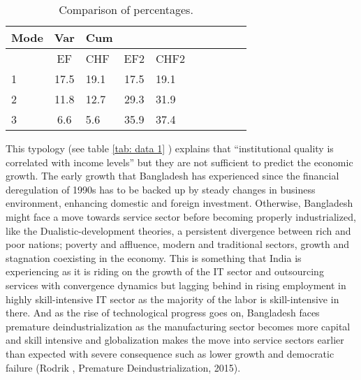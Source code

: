 \begin{table}[!h] 
\caption{Comparison of percentages.}
\begin{tabular}{lclclclclc}
\hline
\hline 
Mode &  Var  &  Cum\\
\hline
{}       & EF   & CHF    & EF2   & CHF2\\
1   &  17.5 & 19.1   & 17.5  & 19.1\\
2   &  11.8 & 12.7   & 29.3  &  31.9\\
3   &  6.6  &  5.6         & 35.9    &  37.4\\
\hline
\end{tabular}
\end{table}

This typology (see table \ref{tab: data 1} ) explains that “institutional quality is correlated with income levels” but they are not sufficient to predict the economic growth. The early growth that Bangladesh has experienced since the financial deregulation of 1990s has to be backed up by steady changes in business environment, enhancing domestic and foreign investment. Otherwise, Bangladesh might face a move towards service sector before becoming properly industrialized, like the Dualistic-development theories, a persistent divergence between rich and poor nations; poverty and affluence, modern and traditional sectors, growth and stagnation coexisting in the economy. This is something that India is experiencing as it is riding on the growth of the IT sector and outsourcing services with convergence dynamics but lagging behind in rising employment in highly skill-intensive IT sector as the majority of the labor is skill-intensive in there. And as the rise of technological progress goes on, Bangladesh faces premature deindustrialization as the manufacturing sector becomes more capital and skill intensive and globalization makes the move into service sectors earlier than expected with severe consequence such as lower growth and democratic failure (Rodrik , Premature Deindustrialization, 2015).
